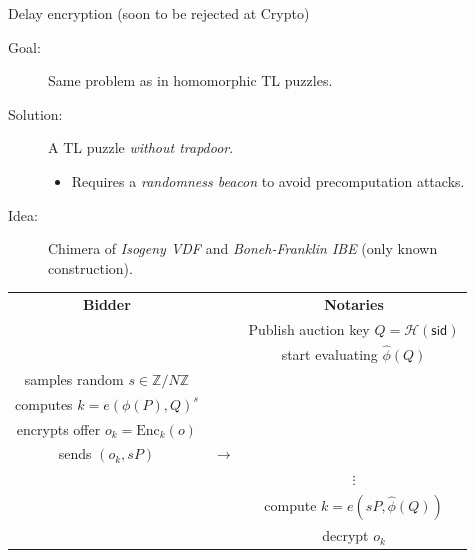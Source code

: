 \documentclass[aspectratio=169]{beamer}
\newcommand{\Z}{\mathbb{Z}}
\begin{document}
\begin{frame}{Delay encryption {\small(soon to be rejected at Crypto)}}
  \begin{description}
  \item[Goal:] Same problem as in homomorphic TL puzzles.
  \item[Solution:] A TL puzzle \emph{without trapdoor}.
    \begin{itemize}
    \item Requires a \emph{randomness beacon} to avoid precomputation
      attacks.
    \end{itemize}
  \item[Idea:] Chimera of \emph{Isogeny VDF} and \emph{Boneh-Franklin
      IBE} {\color{gray}\small(only known construction)}.
  \end{description}

  \bigskip
  \centering
  \begin{tabular}{c c c}
    \textbf{Bidder} && \textbf{Notaries}\\
                    && Publish auction key \emph{$Q = \mathcal{H}(\mathsf{sid})$}\\
                    && start evaluating \emph{$\hat\phi(Q)$}\\
    samples random \emph{$s\in\Z/N\Z$}\\
    computes \emph{$k = e(\phi(P), Q)^s$}\\
    encrypts offer \emph{$o_k = \mathrm{Enc}_{k}(o)$}\\
    \hfill sends \emph{$(o_k,sP)$} & $\longrightarrow$\\
                    && $\vdots$\\
                    && compute \emph{$k = e(sP, \hat\phi(Q))$}\\
                    && decrypt \emph{$o_k$}
  \end{tabular}
\end{frame}

\end{document}
